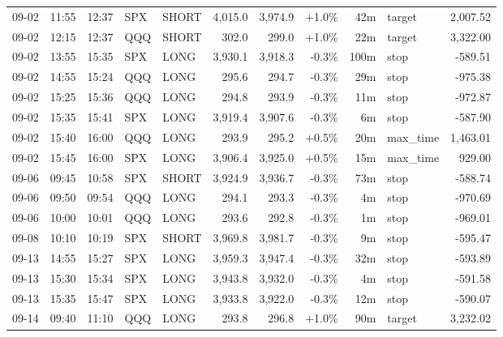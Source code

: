 \documentclass[11pt,a4paper,twoside]{article}
\begin{document}
\begin{center}
\begin{longtable}{>{\color{txtmain}}l l l l l r r r r >{\color{txtmain}}l r}
09-02 & 11:55 & 12:37 & SPX & SHORT & 4,015.0 & 3,974.9 & \textcolor{wingreen}{+1.0\%} & 42m & target & \textcolor{wingreen}{2,007.52} \\
09-02 & 12:15 & 12:37 & QQQ & SHORT & 302.0 & 299.0 & \textcolor{wingreen}{+1.0\%} & 22m & target & \textcolor{wingreen}{3,322.00} \\
09-02 & 13:55 & 15:35 & SPX & LONG & 3,930.1 & 3,918.3 & \textcolor{lossred}{-0.3\%} & 100m & stop & \textcolor{lossred}{-589.51} \\
09-02 & 14:55 & 15:24 & QQQ & LONG & 295.6 & 294.7 & \textcolor{lossred}{-0.3\%} & 29m & stop & \textcolor{lossred}{-975.38} \\
09-02 & 15:25 & 15:36 & QQQ & LONG & 294.8 & 293.9 & \textcolor{lossred}{-0.3\%} & 11m & stop & \textcolor{lossred}{-972.87} \\
09-02 & 15:35 & 15:41 & SPX & LONG & 3,919.4 & 3,907.6 & \textcolor{lossred}{-0.3\%} & 6m & stop & \textcolor{lossred}{-587.90} \\
09-02 & 15:40 & 16:00 & QQQ & LONG & 293.9 & 295.2 & \textcolor{wingreen}{+0.5\%} & 20m & max\_time & \textcolor{wingreen}{1,463.01} \\
09-02 & 15:45 & 16:00 & SPX & LONG & 3,906.4 & 3,925.0 & \textcolor{wingreen}{+0.5\%} & 15m & max\_time & \textcolor{wingreen}{929.00} \\
09-06 & 09:45 & 10:58 & SPX & SHORT & 3,924.9 & 3,936.7 & \textcolor{lossred}{-0.3\%} & 73m & stop & \textcolor{lossred}{-588.74} \\
09-06 & 09:50 & 09:54 & QQQ & LONG & 294.1 & 293.3 & \textcolor{lossred}{-0.3\%} & 4m & stop & \textcolor{lossred}{-970.69} \\
09-06 & 10:00 & 10:01 & QQQ & LONG & 293.6 & 292.8 & \textcolor{lossred}{-0.3\%} & 1m & stop & \textcolor{lossred}{-969.01} \\
09-08 & 10:10 & 10:19 & SPX & SHORT & 3,969.8 & 3,981.7 & \textcolor{lossred}{-0.3\%} & 9m & stop & \textcolor{lossred}{-595.47} \\
09-13 & 14:55 & 15:27 & SPX & LONG & 3,959.3 & 3,947.4 & \textcolor{lossred}{-0.3\%} & 32m & stop & \textcolor{lossred}{-593.89} \\
09-13 & 15:30 & 15:34 & SPX & LONG & 3,943.8 & 3,932.0 & \textcolor{lossred}{-0.3\%} & 4m & stop & \textcolor{lossred}{-591.58} \\
09-13 & 15:35 & 15:47 & SPX & LONG & 3,933.8 & 3,922.0 & \textcolor{lossred}{-0.3\%} & 12m & stop & \textcolor{lossred}{-590.07} \\
09-14 & 09:40 & 11:10 & QQQ & LONG & 293.8 & 296.8 & \textcolor{wingreen}{+1.0\%} & 90m & target & \textcolor{wingreen}{3,232.02} \\

\end{longtable}
\end{center}
\end{document}
